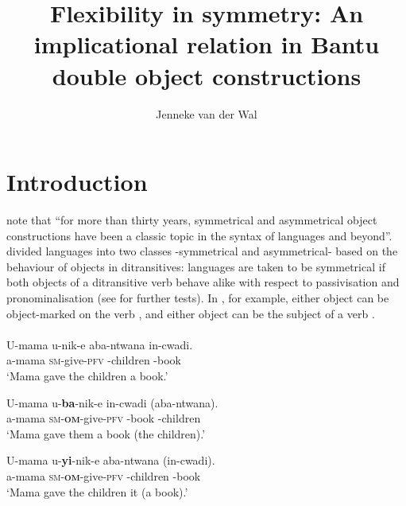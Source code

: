 \documentclass[output=paper]{LSP/langsci}
\author{Jenneke van der Wal	\affiliation{Harvard University}
}
\title{Flexibility in symmetry: An implicational relation in Bantu double object constructions}
\begin{document}
 


  
\section{Introduction}\label{sec:vdw:1}
\citet[54]{BakerEtAl2012} note that “for more than thirty years, symmetrical and asymmetrical object constructions have been a classic topic in the syntax of  languages and beyond”. \citet{BresnanMoshi1990} divided  languages into two classes -symmetrical and asymmetrical- based on the behaviour of objects in ditransitives: languages are taken to be symmetrical if both objects of a ditransitive verb behave alike with respect to passivisation and pronominalisation (see \citealt{Ngonyani1996,Buell2005} for further tests). In , for example, either object can be object-marked on the verb , and either object can be the subject of a  verb .\\

\noindent {} \citep[11]{Adams2010}\\
\ea\label{ex:vanderwal:1}%
\ea\label{ex:vanderwal:1a}
\gll U-mama  u-nik-e  aba-ntwana   in-cwadi.\\
    a-mama  \textsc{sm}{}-give-\textsc{pfv}  -children  -book\\
    \glt ‘Mama gave the children a book.’

 \ex\label{ex:vanderwal:1b}
\gll U-mama  u-\textbf{ba}{}-nik-e  in-cwadi  (aba-ntwana).\\
    a-mama  \textsc{sm}{}-\textbf{\textsc{om}}{}-give-\textsc{pfv}  -book  -children\\
    \glt ‘Mama gave them a book (the children).’

 \ex\label{ex:vanderwal:1c}
\gll U-mama  u-\textbf{yi}{}-nik-e  aba-ntwana   (in-cwadi).\\
    a-mama  \textsc{sm}{}-\textbf{\textsc{om}}{}-give-\textsc{pfv}  -children  -book\\
    \glt ‘Mama gave the children it (a book).’
\z
\z
\end{document}
